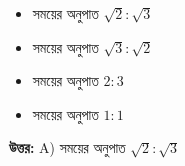 \documentclass[12pt, a4paper]{article}
\begin{document}
\begin{itemize}[label={}, leftmargin=1cm, itemsep=0.5em]
    \item[\textbf{A)}] সময়ের অনুপাত $\sqrt{2} : \sqrt{3}$
    \item[\textbf{B)}] সময়ের অনুপাত $\sqrt{3} : \sqrt{2}$
    \item[\textbf{C)}] সময়ের অনুপাত $2 : 3$
    \item[\textbf{D)}] সময়ের অনুপাত $1 : 1$
\end{itemize}

\vspace{0.5em}
\begin{tcolorbox}[answerbox]
    \textbf{\color{success} উত্তর:} A) সময়ের অনুপাত $\sqrt{2} : \sqrt{3}$
\end{tcolorbox}
\vspace{1em}
\end{document}
